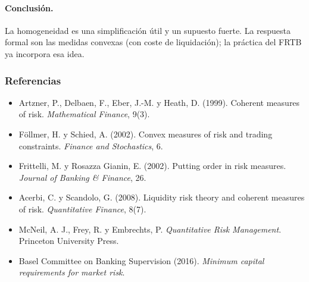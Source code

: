 \documentclass[a4paper,12pt]{article}
\begin{document}
\paragraph{Conclusi\'on.} La homogeneidad es una simplificaci\'on \'util y un supuesto fuerte. La respuesta formal son las medidas convexas (con coste de liquidaci\'on); la pr\'actica del FRTB ya incorpora esa idea.

\subsubsection*{Referencias}
\begin{itemize}[leftmargin=*,itemsep=0pt]
\item Artzner, P., Delbaen, F., Eber, J.-M. y Heath, D. (1999). Coherent measures of risk. \emph{Mathematical Finance}, 9(3).
\item F\"ollmer, H. y Schied, A. (2002). Convex measures of risk and trading constraints. \emph{Finance and Stochastics}, 6.
\item Frittelli, M. y Rosazza Gianin, E. (2002). Putting order in risk measures. \emph{Journal of Banking \& Finance}, 26.
\item Acerbi, C. y Scandolo, G. (2008). Liquidity risk theory and coherent measures of risk. \emph{Quantitative Finance}, 8(7).
\item McNeil, A. J., Frey, R. y Embrechts, P. \emph{Quantitative Risk Management}. Princeton University Press.
\item Basel Committee on Banking Supervision (2016). \emph{Minimum capital requirements for market risk}.
\end{itemize}
\end{document}
